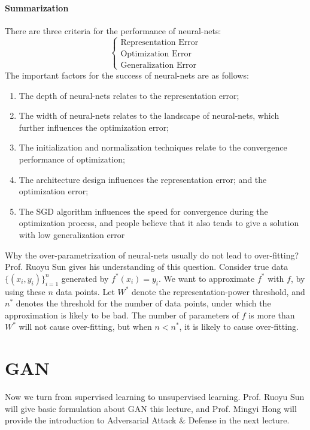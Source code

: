 \paragraph{Summarization}
There are three criteria for the performance of neural-nets:
\[
\left\{
\begin{aligned}
\text{Representation Error}\\
\text{Optimization Error}\\
\text{Generalization Error}
\end{aligned}
\right.
\]
The important factors for the success of neural-nets are as follows:
\begin{enumerate}
\item
The depth of neural-nets relates to the representation error;
\item
The width of neural-nets relates to the landscape of neural-nets, which further influences the optimization error;
\item
The initialization and normalization techniques relate to the convergence performance of optimization;
\item
The architecture design influences the representation error;
and the optimization error;
\item
The SGD algorithm influences the speed for convergence during the optimization process, and people believe that it also tends to give a solution with low generalization error
\end{enumerate}
\begin{remark}
Why the over-parametrization of neural-nets usually do not lead to over-fitting?
Prof. Ruoyu Sun gives his understanding of this question.
Consider true data $\{(x_i,y_i)\}_{i=1}^n$ generated by $f^*(x_i) = y_i$.
We want to approximate $f^*$ with $f$, by using these $n$ data points.
Let $W^*$ denote the representation-power threshold, and $n^*$ denotes the threshold for the number of data points, under which the approximation is likely to be bad.
The number of parameters of $f$ is more than $W^*$ will not cause over-fitting, 
but when $n<n^*$, it is likely to cause over-fitting.
\end{remark}

\section{GAN}
Now we turn from supervised learning to unsupervised learning. Prof. Ruoyu Sun will give basic formulation about GAN this lecture, and Prof. Mingyi Hong will provide the introduction to  Adversarial Attack $\&$ Defense in the next lecture.

